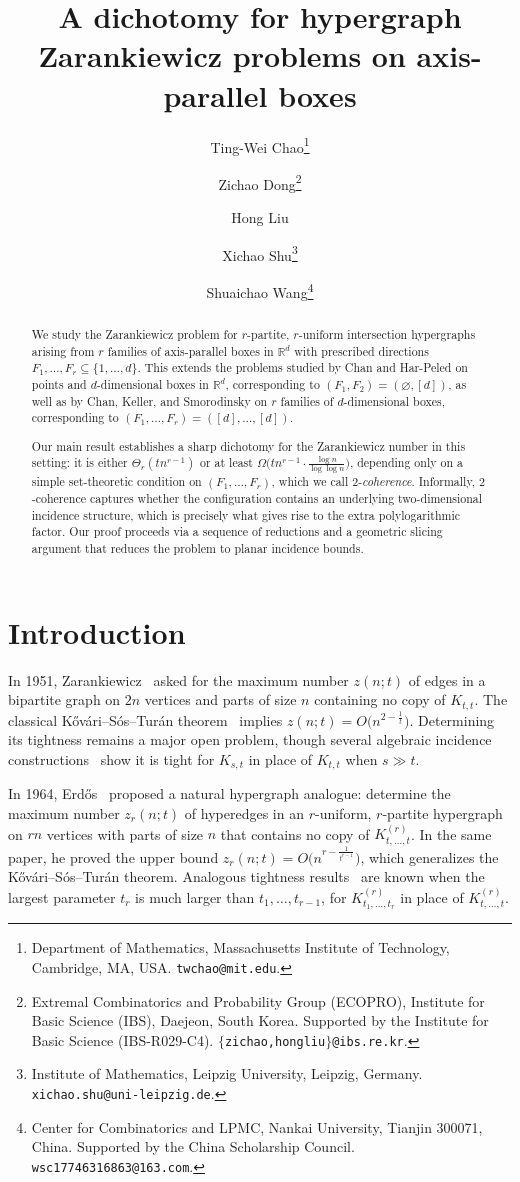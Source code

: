 \documentclass[11pt]{article}
\author{
Ting-Wei Chao\thanks{Department of Mathematics, Massachusetts Institute of Technology, Cambridge, MA, USA. \texttt{twchao@mit.edu}. }
\and Zichao Dong\thanks{Extremal Combinatorics and Probability Group (ECOPRO), Institute for Basic Science (IBS), Daejeon, South Korea. Supported by the Institute for Basic Science (IBS-R029-C4). \texttt{$\{$zichao,hongliu$\}$@ibs.re.kr}. }
\and Hong Liu\footnotemark[2]
\and Xichao Shu\thanks{Institute of Mathematics, Leipzig University, Leipzig, Germany. \texttt{xichao.shu@uni-leipzig.de}. }
\and Shuaichao Wang\thanks{Center for Combinatorics and LPMC, Nankai University, Tianjin 300071, China. Supported by the China Scholarship Council. \texttt{wsc17746316863@163.com}. }
}
\date{}
\title{A dichotomy for hypergraph Zarankiewicz problems on axis-parallel boxes}
\theoremstyle{definition}
\begin{document}
\maketitle

\begin{abstract}
 We study the Zarankiewicz problem for $r$-partite, $r$-uniform intersection hypergraphs arising from $r$ families of axis-parallel boxes in $\mathbb{R}^d$ with prescribed directions $F_1, \dots, F_r \subseteq \{1, \dots, d\}$. This extends the problems studied by Chan and Har-Peled on points and $d$-dimensional boxes in $\mathbb{R}^d$, corresponding to $(F_1,F_2)=(\varnothing,[d])$, as well as by Chan, Keller, and Smorodinsky on $r$ families of $d$-dimensional boxes, corresponding to $(F_1,\dots,F_r)=([d],\dots,[d])$.

Our main result establishes a sharp dichotomy for the Zarankiewicz number in this setting: it is either $\Theta_r(tn^{r-1})$ or at least $\Omega \bigl( tn^{r-1} \cdot \frac{\log n}{\log\log n} \bigr)$, depending only on a simple set-theoretic condition on $(F_1,\dots,F_r)$, which we call $2$-\emph{coherence}. Informally, $2$-coherence captures whether the configuration contains an underlying two-dimensional incidence structure, which is precisely what gives rise to the extra polylogarithmic factor. Our proof proceeds via a sequence of reductions and a geometric slicing argument that reduces the problem to planar incidence bounds.
\end{abstract}

\section{Introduction} \label{sec:intro}

In 1951, Zarankiewicz~\cite{zarankiewicz} asked for the maximum number $z(n; t)$ of edges in a bipartite graph on $2n$ vertices and parts of size $n$ containing no copy of $K_{t, t}$. The classical K\H{o}v\'{a}ri--S\'{o}s--Tur\'{a}n theorem~\cite{kovari_sos_turan} implies $z(n; t) = O \bigl( n^{2 - \frac{1}{t}} \bigr)$. Determining its tightness remains a major open problem, though several algebraic incidence constructions~\cite{kollar_ronyai_szabo,alon_ronyai_szabo,bukh2015,bukh2024} show it is tight for $K_{s, t}$ in place of $K_{t, t}$ when $s \gg t$. 

In 1964, Erd\H{o}s~\cite{erdos1964} proposed a natural hypergraph analogue: determine the maximum number $z_r(n; t)$ of hyperedges in an $r$-uniform, $r$-partite hypergraph on $rn$ vertices with parts of size $n$ that contains no copy of $K^{(r)}_{t, \dots, t}$. In the same paper, he proved the upper bound $z_r(n; t) = O \bigl( n^{r - \frac{1}{t^{r-1}}} \bigr)$, which generalizes the K\H{o}v\'{a}ri--S\'{o}s--Tur\'{a}n theorem. Analogous tightness results~\cite{ma_yuan_zhang, chen_liu_ye} are known when the largest parameter $t_r$ is much larger than $t_1, \dots, t_{r-1}$, for $K_{t_1, \dots, t_r}^{(r)}$ in place of $K_{t, \dots, t}^{(r)}$. 
\end{document}
